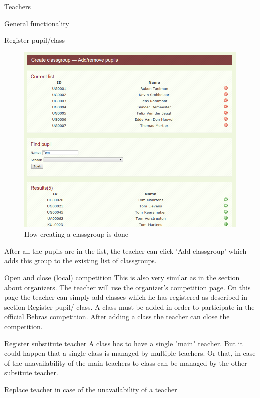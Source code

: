 \begin{section}{Teachers}
\begin{subsection}{General functionality}
\begin{subsubsection}{Register pupil/class}
\begin{figure}[!h]
                \includegraphics[width=1\textwidth]{formal/img/add_remove_pupil_classgroup.png}
                \caption{How creating a classgroup is done}
                \label{create_classgroup}
            \end{figure}
            After all the pupils are in the list, the teacher can click 'Add classgroup' which adds this group to the existing list
            of classgroups. 
        \end{subsubsection}
        \begin{subsubsection}{Open and close (local) competition}
            This is also very similar as in the section about organizers. The teacher will use the organizer's competition page.
            On this page the teacher can simply add classes which he has registered as described in section Register pupil/ class.
            A class must be added in order to participate in the official Bebras competition. After adding a class the teacher can
            close the competition.\\
        \end{subsubsection}
        \begin{subsection}{Register substitute teacher}
        A class has to have a single "main" teacher. But it could happen that a single class is managed by multiple teachers. Or that, in case of the unavailability of the main teachers to class can be managed by the other subsitute teacher.
        \end{subsection}
        \begin{subsection}{Replace teacher in case of the unavailability of a teacher}

\end{subsection}
\end{subsection}
\end{section}
